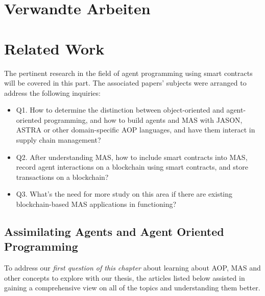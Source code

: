 {\chapter{Verwandte Arbeiten}}
{\chapter{Related Work}}
\label{sec:related}


The pertinent research in the field of agent programming using smart contracts will be covered in this part. The associated papers' subjects were arranged to address the following inquiries: 
\begin{itemize}[label={}]
    \item Q1. How to determine the distinction between object-oriented and agent-oriented programming, and how to build agents and \ac{MAS} with JASON, \ac{ASTRA} or other domain-specific \ac{AOP} languages, and have them interact in supply chain management?\\
    
    \item Q2. After understanding \ac{MAS}, how to include smart contracts into \ac{MAS}, record agent interactions on a blockchain using smart contracts, and store transactions on a blockchain?\\

    \item Q3. What's the need for more study on this area if there are existing blockchain-based \ac{MAS} applications in functioning?
\end{itemize}

\section{Assimilating Agents and Agent Oriented Programming}

To address our \textit{first question of this chapter} about learning about \ac{AOP}, \ac{MAS} and other concepts to explore with our thesis, the articles listed below assisted in gaining a comprehensive view on all of the topics and understanding them better.

